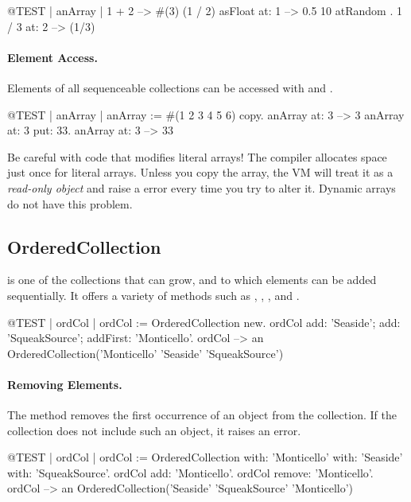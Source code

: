\documentclass[a4paper,10pt,twoside]{book}
\begin{document}
\begin{code}{@TEST | anArray |}
{1 + 2} --> #(3)
{(1 / 2) asFloat} at: 1 --> 0.5
{10 atRandom . 1 / 3} at: 2 --> (1/3)
\end{code}

\paragraph{Element Access.}
Elements of all sequenceable collections can be accessed with  and .

\begin{code}{@TEST | anArray |}
anArray := #(1 2 3 4 5 6) copy.
anArray at: 3 --> 3
anArray at: 3 put: 33.
anArray at: 3 --> 33
\end{code}

\noindent
Be careful with code that modifies literal arrays!
The compiler allocates space just once for literal arrays.
Unless you copy the array, the VM will treat it as a \emph{read-only object} and raise a  error every time you try to alter it.
Dynamic arrays do not have this problem.

\subsection{OrderedCollection}
 is one of the collections that can grow, and to which elements can be added sequentially.
It offers a variety of methods such as , , , and .

\begin{code}{@TEST | ordCol |}
ordCol := OrderedCollection new.
ordCol add: 'Seaside'; add: 'SqueakSource'; addFirst: 'Monticello'.
ordCol --> an OrderedCollection('Monticello' 'Seaside' 'SqueakSource')
\end{code}

\paragraph{Removing Elements.}
The method   removes the first occurrence of an object from the collection.
If the collection does not include such an object, it raises an error.

\begin{code}{@TEST | ordCol | ordCol := OrderedCollection with: 'Monticello' with: 'Seaside' with: 'SqueakSource'.}
ordCol add: 'Monticello'.
ordCol remove: 'Monticello'.
ordCol --> an OrderedCollection('Seaside' 'SqueakSource' 'Monticello')
\end{code}
\end{document}
